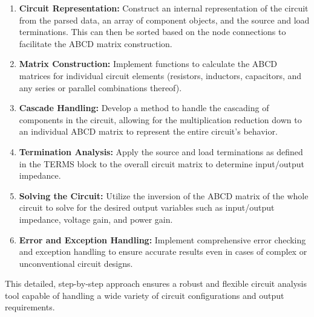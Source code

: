 \documentclass[a4paper]{article}
\begin{document}
\begin{enumerate}
    \item \textbf{Circuit Representation:} Construct an internal representation of the circuit from the parsed data, an array of component objects, and the source and load terminations. This can then be sorted based on the node connections to facilitate the ABCD matrix construction.
    \item \textbf{Matrix Construction:} Implement functions to calculate the ABCD matrices for individual circuit elements (resistors, inductors, capacitors, and any series or parallel combinations thereof).
    \item \textbf{Cascade Handling:} Develop a method to handle the cascading of components in the circuit, allowing for the multiplication reduction down to an individual ABCD matrix to represent the entire circuit's behavior.
    \item \textbf{Termination Analysis:} Apply the source and load terminations as defined in the TERMS block to the overall circuit matrix to determine input/output impedance.
    \item \textbf{Solving the Circuit:} Utilize the inversion of the ABCD matrix of the whole circuit to solve for the desired output variables such as input/output impedance, voltage gain, and power gain.
    \item \textbf{Error and Exception Handling:} Implement comprehensive error checking and exception handling to ensure accurate results even in cases of complex or unconventional circuit designs.
\end{enumerate}

This detailed, step-by-step approach ensures a robust and flexible circuit analysis tool capable of handling a wide variety of circuit configurations and output requirements.
\end{document}
